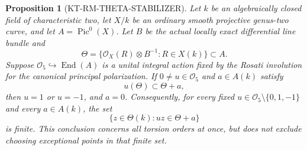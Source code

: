 \documentclass[11pt,a4paper]{article}
\newtheorem{proposition}[theorem]{Proposition}
\theoremstyle{definition}
\begin{document}
\begin{proposition}[KT-RM-THETA-STABILIZER]
Let $k$ be an algebraically closed field of characteristic two, let
$X/k$ be an ordinary smooth projective genus-two curve, and let
$A=\operatorname{Pic}^0(X)$.  Let $B$ be the actual locally exact
differential line bundle and
\[
 \Theta=\{\mathcal O_X(R)\otimes B^{-1}:R\in X(k)\}\subset A.
                                                               \tag{RT.1}
\]
Suppose $\mathcal O_5\hookrightarrow\operatorname{End}(A)$ is
a unital integral action fixed by the Rosati involution for the
canonical principal polarization.  If $0\ne u\in\mathcal O_5$
and $a\in A(k)$ satisfy
\[
                         u(\Theta)\subset\Theta+a,
                                                               \tag{RT.2}
\]
then $u=1$ or $u=-1$, and $a=0$.
Consequently, for every fixed $u\in\mathcal O_5\setminus\{0,1,-1\}$
and every $a\in A(k)$, the set
\[
                    \{z\in\Theta(k):u z\in\Theta+a\}
                                                               \tag{RT.3}
\]
is finite.  This conclusion concerns all torsion orders at once,
but does not exclude choosing exceptional points in that finite set.
\end{proposition}
\end{document}
